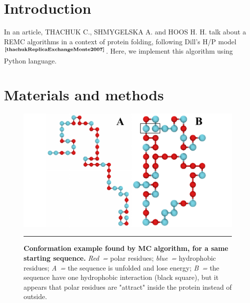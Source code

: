 \documentclass[12pt, oneside, a4paper]{report}
\newcommand{\p}[1]{$^\text{#1}$}
\newcommand{\Cite}[1]{\p{\textbf{\cite{#1}}}}
\begin{document}
\vspace{2ex}

\begin{multicols}{2}
\section{Introduction}
\vspace{-1ex}

In an article, THACHUK C., SHMYGELSKA A. and HOOS H. H. talk about a REMC algorithms in a context of protein folding, following Dill's H/P model\Cite{thachukReplicaExchangeMonte2007}. Here, we implement this algorithm using Python language.

\vspace{-2ex}

\section{Materials and methods}
\vspace{-1ex}

\begin{figure}[!b]
    \includegraphics[width=\textwidth]{figure/conformation_example.pdf}
    
    \small
    \vspace{0.5ex}
    \hrule height 1pt

    \caption{
        \textbf{Conformation example found by MC algorithm, for a same starting sequence.} \textit{Red~=} polar residues; \textit{blue~=} hydrophobic residues; \textit{A~=} the sequence is unfolded and lose energy; \textit{B~=} the sequence have one hydrophobic interaction (black square), but it appears that polar residues are "attract" inside the protein instead of outside.
        \label{f:conformation_example}}
\end{figure}


\end{multicols}
\end{document}
